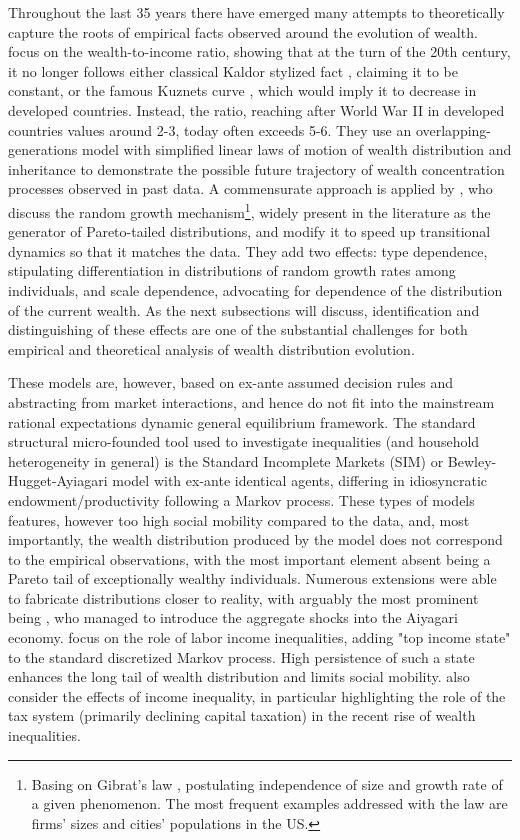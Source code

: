 \documentclass[12pt]{article}
\begin{document}
Throughout the last 35 years there have emerged many attempts to theoretically capture the roots of empirical facts observed around the evolution of wealth. \textcite{piketty2015} focus on the wealth-to-income ratio, showing that at the turn of the 20th century, it no longer follows either classical Kaldor stylized fact \parencite{kaldor1957}, claiming it to be constant, or the famous Kuznets curve \parencite{kuznets1955}, which would imply it to decrease in developed countries. Instead, the ratio, reaching after World War II in developed countries values around 2-3, today often exceeds 5-6. They use an overlapping-generations model with simplified linear laws of motion of wealth distribution and inheritance to demonstrate the possible future trajectory of wealth concentration processes observed in past data. A commensurate approach is applied by \textcite{gabaix2016}, who discuss the random growth mechanism\footnote{Basing on Gibrat's law \parencite{gibrat1931}, postulating independence of size and growth rate of a given phenomenon. The most frequent examples addressed with the law are firms' sizes and cities' populations in the US.}, widely present in the literature as the generator of Pareto-tailed distributions, and modify it to speed up transitional dynamics so that it matches the data. They add two effects: type dependence, stipulating differentiation in distributions of random growth rates among individuals, and scale dependence, advocating for dependence of the distribution of the current wealth. As the next subsections will discuss, identification and distinguishing of these effects are one of the substantial challenges for both empirical and theoretical analysis of wealth distribution evolution.

These models are, however, based on ex-ante assumed decision rules and abstracting from market interactions, and hence do not fit into the mainstream rational expectations dynamic general equilibrium framework. The standard structural micro-founded tool used to investigate inequalities (and household heterogeneity in general) is the Standard Incomplete Markets (SIM) or Bewley-Hugget-Ayiagari model \parencite{bewley1977, huggett1993, aiyagari1994} with ex-ante identical agents, differing in idiosyncratic endowment/productivity following a Markov process. These types of models features, however too high social mobility compared to the data, and, most importantly, the wealth distribution produced by the model does not correspond to the empirical observations, with the most important element absent being a Pareto tail of exceptionally wealthy individuals. Numerous extensions were able to fabricate distributions closer to reality, with arguably the most prominent being \textcite{krusell1998}, who managed to introduce the aggregate shocks into the Aiyagari economy. \textcite{castaneda2003} focus on the role of labor income inequalities, adding "top income state" to the standard discretized Markov process. High persistence of such a state enhances the long tail of wealth distribution and limits social mobility. \textcite{kaymak2016} also consider the effects of income inequality, in particular highlighting the role of the tax system (primarily declining capital taxation) in the recent rise of wealth inequalities.
\end{document}
